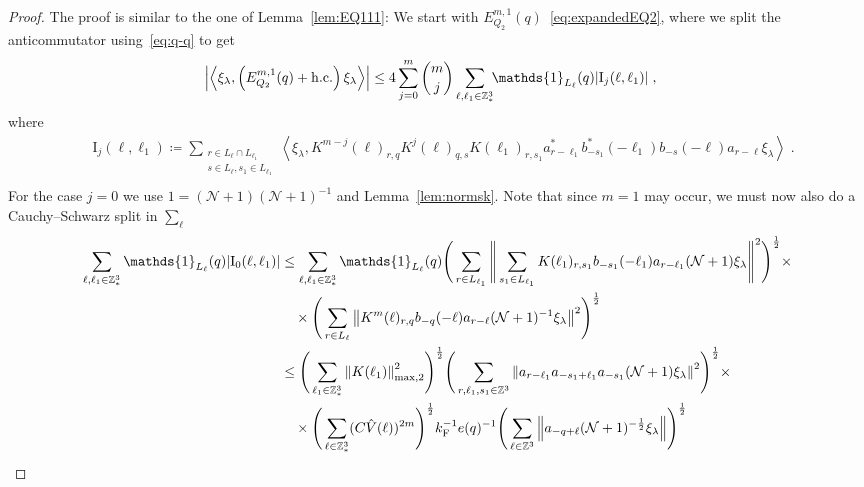 \documentclass[12pt,a4paper]{article}
\numberwithin{equation}{section}
\newcommand{\1}{\mathbb{I}}
\newcommand{\F}{\mathrm{F}}
\newcommand{\I}{\mathrm{I}}
\newcommand{\Z}{\mathbb{Z}}
\newcommand{\NN}{\mathcal{N}}
\newcommand{\half}{\frac{1}{2}}
\newcommand{\eva}[1]{\left\langle #1 \right\rangle}
\theoremstyle{plain}
\theoremstyle{definition}
\theoremstyle{remark}
\theoremstyle{plain}
\theoremstyle{definition}
\theoremstyle{remark}
\begin{document}
\begin{proof}
The proof is similar to the one of Lemma~\ref{lem:EQ111}: We start with $ E^{m,1}_{Q_2}(q) $~\eqref{eq:expandedEQ2}, where we split the anticommutator using~\eqref{eq:q-q} to get
\begin{equation} \label{eq:EQ2111}
\begin{aligned}
	& \abs{\eva{\xi_\lambda,\left(E^{m,1}_{Q_2}(q) + \mathrm{h.c.}\right) \xi_\lambda }}
	\le 4 \sum_{j=0}^m {{m}\choose j} \sum_{\ell,\ell_1 \in \Z^3_*}\!\! \mathds{1}_{L_\ell}(q) |\I_j(\ell, \ell_1)| \;,
	\end{aligned}
\end{equation}
where
\begin{equation}
\begin{aligned}
	& \I_j(\ell, \ell_1)
	\coloneq \sum_{\substack{r\in L_{\ell} \cap L_{\ell_1}\\ s \in L_{\ell},s_1\in L_{\ell_1}}}
		\eva{\xi_\lambda, K^{m-j}(\ell)_{r,q} K^{j}(\ell)_{q,s} K(\ell_1)_{r,s_1} a^*_{r-\ell_1} b^*_{-s_1}(-\ell_1) b_{-s}(-\ell) a_{r-\ell} \xi_\lambda} \;. \\
\end{aligned}
\end{equation}
For the case $ j = 0 $ we use $1 = (\NN+1) (\NN+1)^{-1}$ and Lemma~\ref{lem:normsk}. Note that since $ m = 1 $ may occur, we must now also do a Cauchy--Schwarz split in $ \sum_\ell $
\begin{align}
	\sum_{\ell,\ell_1 \in \Z^3_*} \mathds{1}_{L_\ell}(q) |\I_0(\ell, \ell_1)|
 	&\leq \sum\limits_{\ell,\ell_1 \in \Z^3_*} \mathds{1}_{L_\ell}(q) \Bigg( \sum\limits_{r \in L_{\ell_1}} 
 		\Bigg\Vert \sum\limits_{s_1 \in L_{\ell_1}} K(\ell_1)_{r,s_1} b_{-s_1}(-\ell_1) a_{r-\ell_1} (\NN+1) \xi_\lambda \Bigg\Vert^2\Bigg)^\half \times\nonumber\\
 	&\quad \times \Bigg( \sum\limits_{r \in L_\ell} \norm{K^{m}(\ell)_{r,q} b_{-q}(-\ell) a_{r-\ell} (\NN+1)^{-1}\xi_\lambda }^2\Bigg)^\half \nonumber\\
 	&\leq \Bigg( \sum\limits_{\ell_1 \in \Z^3_*} \norm{K(\ell_1)}_{\mathrm{max,2}}^2 \Bigg)^{\half} \Bigg(
 		\sum\limits_{r, \ell_1, s_1 \in \Z^3} \norm{a_{r-\ell_1} a_{-s_1+\ell_1} a_{-s_1} (\NN+1) \xi_\lambda}^2\Bigg)^\half \times\nonumber\\
 	&\quad \times \Bigg( \sum\limits_{\ell \in \Z^3_*}(C \hat{V}(\ell))^{2m} \Bigg)^{\half}
 		k_{\F}^{-1} e(q)^{-1}
 		\Bigg( \sum\limits_{\ell \in \Z^3} \norm{a_{-q + \ell} (\NN+1)^{-\half} \xi_\lambda } \Bigg)^{\half} \nonumber\\

\end{align}
\end{proof}
\end{document}
